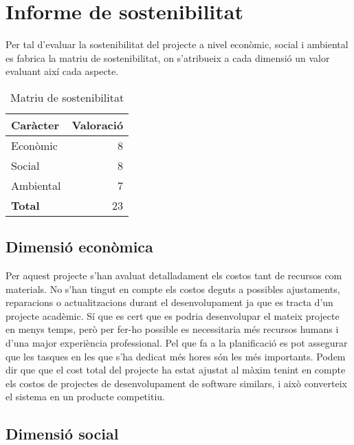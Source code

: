 
\chapter{Informe de sostenibilitat} %

\label{InformeSostenbilitat} %

Per tal d’evaluar la sostenibilitat del projecte a nivel econòmic, social i ambiental es fabrica la matriu de sostenibilitat, on s’atribueix a cada dimensió un
valor evaluant així cada aspecte.\\


\begin{table}[!h]
\centering
\begin{tabular}{|l|r|}
\hline
\textbf{Caràcter}  & \textbf{Valoració} \\\hline
Econòmic & 8 \\\hline
Social & 8 \\\hline
Ambiental & 7 \\\hline
\textbf{Total} & 23 \\\hline
\end{tabular}
\label{}
\caption{Matriu de sostenibilitat}
\end{table}

\section{Dimensió econòmica}
Per aquest projecte s’han avaluat detalladament els costos tant de recursos com
materials. No s’han tingut en compte els costos deguts a possibles ajustaments,
reparacions o actualitzacions durant el desenvolupament ja que es tracta d’un
projecte acadèmic. Sí que es cert que es podria desenvolupar el mateix projecte
en menys temps, però per fer-ho possible es necessitaria més recursos humans
i d’una major experiència professional. Pel que fa a la planificació es pot assegurar que les tasques en les que s’ha dedicat més hores són les més importants.
Podem dir que que el cost total del projecte ha estat ajustat al màxim tenint en
compte els costos de projectes de desenvolupament de software similars, i això
converteix el sistema en un producte competitiu.

\section{Dimensió social}

